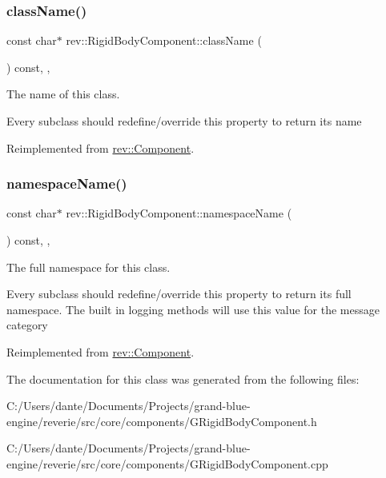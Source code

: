 \subsubsection{\texorpdfstring{className()}{className()}}
{\footnotesize\ttfamily const char$\ast$ rev\+::\+Rigid\+Body\+Component\+::class\+Name (\begin{DoxyParamCaption}{ }\end{DoxyParamCaption}) const\hspace{0.3cm}{\ttfamily [inline]}, {\ttfamily [override]}, {\ttfamily [virtual]}}



The name of this class. 

Every subclass should redefine/override this property to return its name 

Reimplemented from \mbox{\hyperlink{classrev_1_1_component_a07619152d5acafe7a536df3a6a476349}{rev\+::\+Component}}.

\mbox{\label{classrev_1_1_rigid_body_component_ae206ce233b7fffd3781cc37bbfc6e17d}} 
\subsubsection{\texorpdfstring{namespaceName()}{namespaceName()}}
{\footnotesize\ttfamily const char$\ast$ rev\+::\+Rigid\+Body\+Component\+::namespace\+Name (\begin{DoxyParamCaption}{ }\end{DoxyParamCaption}) const\hspace{0.3cm}{\ttfamily [inline]}, {\ttfamily [override]}, {\ttfamily [virtual]}}



The full namespace for this class. 

Every subclass should redefine/override this property to return its full namespace. The built in logging methods will use this value for the message category 

Reimplemented from \mbox{\hyperlink{classrev_1_1_component_ae2827b14c278588b95e01c4743fae674}{rev\+::\+Component}}.



The documentation for this class was generated from the following files\+:\begin{DoxyCompactItemize}
\item 
C\+:/\+Users/dante/\+Documents/\+Projects/grand-\/blue-\/engine/reverie/src/core/components/G\+Rigid\+Body\+Component.\+h\item 
C\+:/\+Users/dante/\+Documents/\+Projects/grand-\/blue-\/engine/reverie/src/core/components/G\+Rigid\+Body\+Component.\+cpp\end{DoxyCompactItemize}
